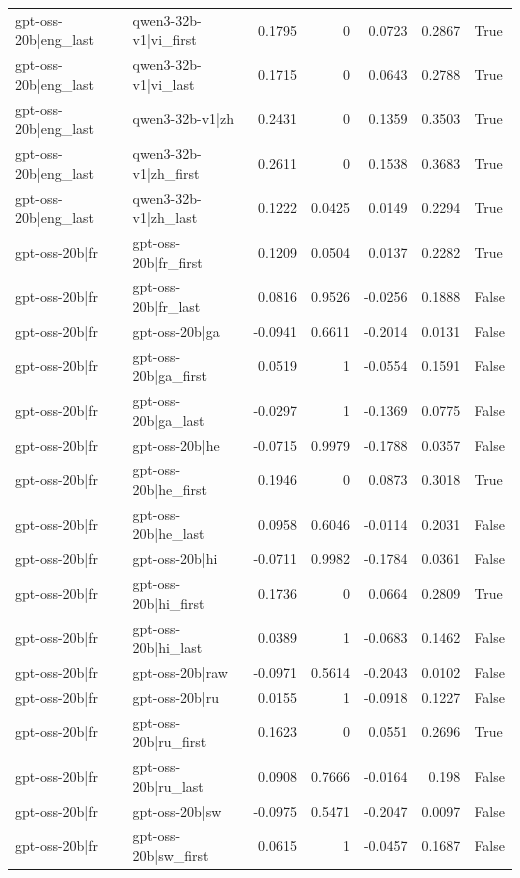 \begin{table}
\begin{tabular}{l l r r r r l}
gpt-oss-20b|eng_last & qwen3-32b-v1|vi_first & 0.1795 & 0 & 0.0723 & 0.2867 & True \\
gpt-oss-20b|eng_last & qwen3-32b-v1|vi_last & 0.1715 & 0 & 0.0643 & 0.2788 & True \\
gpt-oss-20b|eng_last & qwen3-32b-v1|zh & 0.2431 & 0 & 0.1359 & 0.3503 & True \\
gpt-oss-20b|eng_last & qwen3-32b-v1|zh_first & 0.2611 & 0 & 0.1538 & 0.3683 & True \\
gpt-oss-20b|eng_last & qwen3-32b-v1|zh_last & 0.1222 & 0.0425 & 0.0149 & 0.2294 & True \\
gpt-oss-20b|fr & gpt-oss-20b|fr_first & 0.1209 & 0.0504 & 0.0137 & 0.2282 & True \\
gpt-oss-20b|fr & gpt-oss-20b|fr_last & 0.0816 & 0.9526 & -0.0256 & 0.1888 & False \\
gpt-oss-20b|fr & gpt-oss-20b|ga & -0.0941 & 0.6611 & -0.2014 & 0.0131 & False \\
gpt-oss-20b|fr & gpt-oss-20b|ga_first & 0.0519 & 1 & -0.0554 & 0.1591 & False \\
gpt-oss-20b|fr & gpt-oss-20b|ga_last & -0.0297 & 1 & -0.1369 & 0.0775 & False \\
gpt-oss-20b|fr & gpt-oss-20b|he & -0.0715 & 0.9979 & -0.1788 & 0.0357 & False \\
gpt-oss-20b|fr & gpt-oss-20b|he_first & 0.1946 & 0 & 0.0873 & 0.3018 & True \\
gpt-oss-20b|fr & gpt-oss-20b|he_last & 0.0958 & 0.6046 & -0.0114 & 0.2031 & False \\
gpt-oss-20b|fr & gpt-oss-20b|hi & -0.0711 & 0.9982 & -0.1784 & 0.0361 & False \\
gpt-oss-20b|fr & gpt-oss-20b|hi_first & 0.1736 & 0 & 0.0664 & 0.2809 & True \\
gpt-oss-20b|fr & gpt-oss-20b|hi_last & 0.0389 & 1 & -0.0683 & 0.1462 & False \\
gpt-oss-20b|fr & gpt-oss-20b|raw & -0.0971 & 0.5614 & -0.2043 & 0.0102 & False \\
gpt-oss-20b|fr & gpt-oss-20b|ru & 0.0155 & 1 & -0.0918 & 0.1227 & False \\
gpt-oss-20b|fr & gpt-oss-20b|ru_first & 0.1623 & 0 & 0.0551 & 0.2696 & True \\
gpt-oss-20b|fr & gpt-oss-20b|ru_last & 0.0908 & 0.7666 & -0.0164 & 0.198 & False \\
gpt-oss-20b|fr & gpt-oss-20b|sw & -0.0975 & 0.5471 & -0.2047 & 0.0097 & False \\
gpt-oss-20b|fr & gpt-oss-20b|sw_first & 0.0615 & 1 & -0.0457 & 0.1687 & False \\

\end{tabular}
\end{table}
